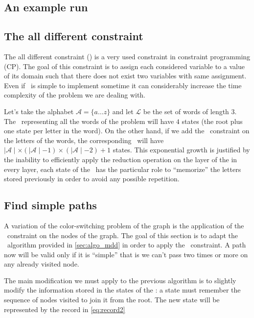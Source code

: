 \subsection{An example run}

\subsection{The all different constraint}

The all different constraint (\alldiff) is a very used constraint in constraint programming (CP). The goal of this constraint is to assign each considered variable to a value of its domain such that there does not exist two variables with same assignment. Even if \alldiff\ is simple to implement sometime it can considerably increase the time complexity of the problem we are dealing with.

Let's take the alphabet $\mathcal{A} = \{a \dots z\}$ and let $\mathcal{L}$ be the set of words of length $3$. The \mdd\ representing all the words of the problem will have $4$ states (the root plus one state per letter in the word). On the other hand, if we add the \alldiff\ constraint on the letters of the words, the corresponding \mdd\ will have $\mid \mathcal{A} \mid \times (\mid \mathcal{A} \mid - 1) \times (\mid \mathcal{A} \mid - 2) + 1$ states. This exponential growth is justified by the inability to efficiently apply the reduction operation on the layer of the \mdd\: in every layer, each state of the \mdd\ has the particular role to ``memorize'' the letters stored previously in order to avoid any possible repetition.

\subsection{Find simple paths}

A variation of the color-switching problem of the graph is the application of the \alldiff\ constraint on the nodes of the graph. The goal of this section is to adapt the \mdd\ algorithm provided in \cref{sec:algo_mdd} in order to apply the \alldiff\ constraint. A path now will be valid only if it is ``simple'' that is we can't pass two times or more on any already visited node.

The main modification we must apply to the previous algorithm is to slightly modify the information stored in the states of the \mdd: a state must remember the sequence of nodes visited to join it from the root. The new state will be represented by the record in \cref{eq:record2}

